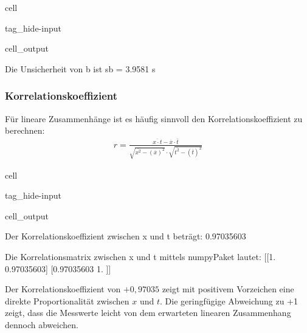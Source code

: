 \documentclass[letterpaper,10pt,english]{jupyterBook}
\begin{document}
\begin{sphinxuseclass}{cell}
\begin{sphinxuseclass}{tag_hide-input}\begin{sphinxVerbatimOutput}

\begin{sphinxuseclass}{cell_output}
\begin{sphinxVerbatim}[commandchars=\\\{\}]
Die Unsicherheit von b ist 	 s\PYGZus{}b = 3.9581 s
\end{sphinxVerbatim}

\end{sphinxuseclass}\end{sphinxVerbatimOutput}

\end{sphinxuseclass}
\end{sphinxuseclass}

\subsubsection{Korrelationskoeffizient }
\label{\detokenize{content/1_Kurvenanpassung:korrelationskoeffizient-a-id-subsec-korrelationskoeffizient-a}}
\sphinxAtStartPar
Für lineare Zusammenhänge ist es häufig sinnvoll den Korrelationskoeffizient zu berechnen:
\begin{equation*}
\begin{split}r = \frac{\overline{x\cdot t} - \overline x \cdot \overline t}{\sqrt{\overline{x^2} - (\overline x)^2} \cdot {\sqrt{\overline{t^2} - (\overline t)^2}}} \end{split}
\end{equation*}
\begin{sphinxuseclass}{cell}
\begin{sphinxuseclass}{tag_hide-input}\begin{sphinxVerbatimOutput}

\begin{sphinxuseclass}{cell_output}
\begin{sphinxVerbatim}[commandchars=\\\{\}]
Der Korrelationskoeffizient zwischen x und t beträgt: 0.97035603

Die Korrelationsmatrix zwischen x und t mittels numpy\PYGZhy{}Paket lautet:
[[1.         0.97035603]
 [0.97035603 1.        ]]
\end{sphinxVerbatim}

\end{sphinxuseclass}\end{sphinxVerbatimOutput}

\end{sphinxuseclass}
\end{sphinxuseclass}
\sphinxAtStartPar
Der Korrelationskoeffizient von \(+ 0,97035\) zeigt mit positivem Vorzeichen eine direkte Proportionalität zwischen \(x\) und \(t\). Die geringfügige Abweichung zu +1 zeigt, dass die Messwerte leicht von dem erwarteten linearen Zusammenhang dennoch abweichen.
\end{document}

